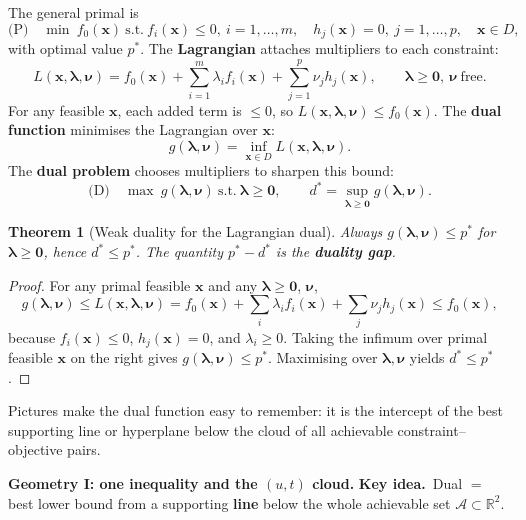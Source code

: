 \documentclass[11pt,a4paper]{article}
\newtheorem{theorem}{Theorem}
\newcommand{\keyidea}[1]{\medskip\noindent\textbf{Key idea.}\ #1\medskip}
\begin{document}
The general primal is
\[
  \text{(P)}\quad
  \min\ f_0(\mathbf{x})
  \ \text{s.t.}\ 
  f_i(\mathbf{x})\le 0,\ i=1,\ldots,m,\quad
  h_j(\mathbf{x})=0,\ j=1,\ldots,p,\quad
  \mathbf{x}\in D,
\]
with optimal value $p^*$.
The \textbf{Lagrangian} attaches multipliers to each constraint:
\[
  L(\mathbf{x},\boldsymbol{\lambda},\boldsymbol{\nu})
  = f_0(\mathbf{x})
  + \sum_{i=1}^m \lambda_i f_i(\mathbf{x})
  + \sum_{j=1}^p \nu_j h_j(\mathbf{x}),
  \qquad \boldsymbol{\lambda}\ge\mathbf{0},\ \boldsymbol{\nu}\ \text{free}.
\]
For any feasible $\mathbf{x}$, each added term is $\le 0$, so $L(\mathbf{x},\boldsymbol{\lambda},\boldsymbol{\nu})\le f_0(\mathbf{x})$.
The \textbf{dual function} minimises the Lagrangian over $\mathbf{x}$:
\[
  g(\boldsymbol{\lambda},\boldsymbol{\nu})
  = \inf_{\mathbf{x}\in D} L(\mathbf{x},\boldsymbol{\lambda},\boldsymbol{\nu}).
\]
The \textbf{dual problem} chooses multipliers to sharpen this bound:
\[
  \text{(D)}\quad \max\ g(\boldsymbol{\lambda},\boldsymbol{\nu})\ \text{s.t.}\ \boldsymbol{\lambda}\ge\mathbf{0},
  \qquad d^* = \sup_{\boldsymbol{\lambda}\ge\mathbf{0}} g(\boldsymbol{\lambda},\boldsymbol{\nu}).
\]

\begin{theorem}[Weak duality for the Lagrangian dual]
Always $g(\boldsymbol{\lambda},\boldsymbol{\nu})\le p^*$ for $\boldsymbol{\lambda}\ge\mathbf{0}$, hence $d^*\le p^*$.
The quantity $p^*-d^*$ is the \textbf{duality gap}.
\end{theorem}

\begin{proof}
For any primal feasible $\mathbf{x}$ and any $\boldsymbol{\lambda}\ge\mathbf{0}$, $\boldsymbol{\nu}$,
\[
  g(\boldsymbol{\lambda},\boldsymbol{\nu})
  \le L(\mathbf{x},\boldsymbol{\lambda},\boldsymbol{\nu})
  = f_0(\mathbf{x}) + \sum_i \lambda_i f_i(\mathbf{x}) + \sum_j \nu_j h_j(\mathbf{x})
  \le f_0(\mathbf{x}),
\]
because $f_i(\mathbf{x})\le 0$, $h_j(\mathbf{x})=0$, and $\lambda_i\ge 0$.
Taking the infimum over primal feasible $\mathbf{x}$ on the right gives
$g(\boldsymbol{\lambda},\boldsymbol{\nu})\le p^*$.
Maximising over $\boldsymbol{\lambda},\boldsymbol{\nu}$ yields $d^*\le p^*$.
\end{proof}

Pictures make the dual function easy to remember: it is the intercept of the best supporting line or
hyperplane below the cloud of all achievable constraint--objective pairs.

\textbf{Geometry I: one inequality and the \texorpdfstring{$(u,t)$}{(u,t)} cloud.}
\keyidea{Dual $=$ best lower bound from a supporting \textbf{line} below the whole achievable set
$\mathcal{A}\subset\mathbb{R}^2$.}
\end{document}
